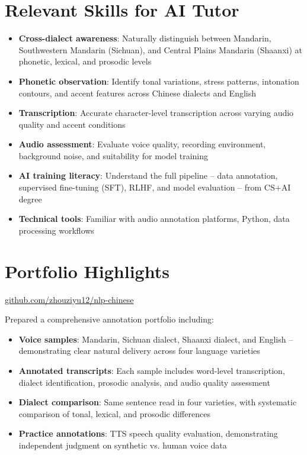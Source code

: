 \documentclass[11pt,a4paper]{article}
\begin{document}
\section{Relevant Skills for AI Tutor}

\begin{itemize}
  \item \textbf{Cross-dialect awareness}: Naturally distinguish between Mandarin, Southwestern Mandarin (Sichuan), and Central Plains Mandarin (Shaanxi) at phonetic, lexical, and prosodic levels
  \item \textbf{Phonetic observation}: Identify tonal variations, stress patterns, intonation contours, and accent features across Chinese dialects and English
  \item \textbf{Transcription}: Accurate character-level transcription across varying audio quality and accent conditions
  \item \textbf{Audio assessment}: Evaluate voice quality, recording environment, background noise, and suitability for model training
  \item \textbf{AI training literacy}: Understand the full pipeline -- data annotation, supervised fine-tuning (SFT), RLHF, and model evaluation -- from CS+AI degree
  \item \textbf{Technical tools}: Familiar with audio annotation platforms, Python, data processing workflows
\end{itemize}

\section{Portfolio Highlights}

\href{https://github.com/zhouziyu12/nlp-chinese}{github.com/zhouziyu12/nlp-chinese}

Prepared a comprehensive annotation portfolio including:
\begin{itemize}
  \item \textbf{Voice samples}: Mandarin, Sichuan dialect, Shaanxi dialect, and English -- demonstrating clear natural delivery across four language varieties
  \item \textbf{Annotated transcripts}: Each sample includes word-level transcription, dialect identification, prosodic analysis, and audio quality assessment
  \item \textbf{Dialect comparison}: Same sentence read in four varieties, with systematic comparison of tonal, lexical, and prosodic differences
  \item \textbf{Practice annotations}: TTS speech quality evaluation, demonstrating independent judgment on synthetic vs. human voice data
\end{itemize}
\end{document}
